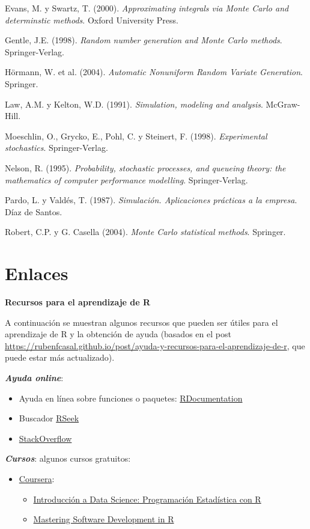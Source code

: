 \documentclass[]{book}
\theoremstyle{definition}
\theoremstyle{definition}
\theoremstyle{definition}
\theoremstyle{remark}
\begin{document}
Evans, M. y Swartz, T. (2000). \emph{Approximating integrals via Monte
Carlo and determinstic methods}. Oxford University Press.

Gentle, J.E. (1998). \emph{Random number generation and Monte Carlo
methods}. Springer-Verlag.

Hörmann, W. et al. (2004). \emph{Automatic Nonuniform Random Variate
Generation}. Springer.

Law, A.M. y Kelton, W.D. (1991). \emph{Simulation, modeling and
analysis}. McGraw-Hill.

Moeschlin, O., Grycko, E., Pohl, C. y Steinert, F. (1998).
\emph{Experimental stochastics}. Springer-Verlag.

Nelson, R. (1995). \emph{Probability, stochastic processes, and queueing
theory: the mathematics of computer performance modelling}.
Springer-Verlag.

Pardo, L. y Valdés, T. (1987). \emph{Simulación. Aplicaciones prácticas
a la empresa}. Díaz de Santos.

Robert, C.P. y G. Casella (2004). \emph{Monte Carlo statistical
methods}. Springer.

\appendix


\chapter{Enlaces}\label{links}

\textbf{Recursos para el aprendizaje de R}

A continuación se muestran algunos recursos que pueden ser útiles para
el aprendizaje de R y la obtención de ayuda (basados en el post
\url{https://rubenfcasal.github.io/post/ayuda-y-recursos-para-el-aprendizaje-de-r},
que puede estar más actualizado).

\textbf{\emph{Ayuda online}}:

\begin{itemize}
\item
  Ayuda en línea sobre funciones o paquetes:
  \href{https://www.rdocumentation.org/}{RDocumentation}
\item
  Buscador \href{http://rseek.org/}{RSeek}
\item
  \href{http://stackoverflow.com/questions/tagged/r}{StackOverflow}
\end{itemize}

\textbf{\emph{Cursos}}: algunos cursos gratuitos:

\begin{itemize}
\item
  \href{https://www.coursera.org/}{Coursera}:

  \begin{itemize}
  \item
    \href{https://www.coursera.org/learn/intro-data-science-programacion-estadistica-r}{Introducción
    a Data Science: Programación Estadística con R}
  \item
    \href{https://www.coursera.org/specializations/r}{Mastering Software
    Development in R}
  \end{itemize}
\end{itemize}
\end{document}
